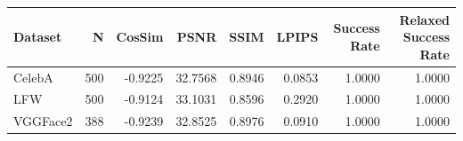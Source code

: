 \begin{tabular}{lrrrrrrr}
\toprule
Dataset & N & CosSim & PSNR & SSIM & LPIPS & Success Rate & Relaxed Success Rate \\
\midrule
CelebA & 500 & -0.9225 & 32.7568 & 0.8946 & 0.0853 & 1.0000 & 1.0000 \\
LFW & 500 & -0.9124 & 33.1031 & 0.8596 & 0.2920 & 1.0000 & 1.0000 \\
VGGFace2 & 388 & -0.9239 & 32.8525 & 0.8976 & 0.0910 & 1.0000 & 1.0000 \\
\bottomrule
\end{tabular}
